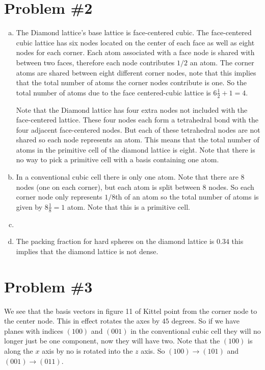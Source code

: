 \documentclass[11pt]{article}
\numberwithin{equation}{section}
\begin{document}
\section{Problem \#2}
\begin{enumerate}[(a)]
\item
The Diamond lattice's base lattice is face-centered cubic. The face-centered cubic lattice has six nodes located on the center of each face as well as eight nodes for each corner. Each atom associated with a face node is shared with between two faces, therefore each node contributes $1/2$ an atom. The corner atoms are shared between eight different corner nodes, note that this implies that the total number of atoms the corner nodes contribute is one. So the total number of atoms due to the face centered-cubic lattice is $6\frac{1}{2}+1=4$.

Note that the Diamond lattice has four extra nodes not included with the face-centered lattice. These four nodes each form a tetrahedral bond with the four adjacent face-centered nodes. But each of these tetrahedral nodes are not shared so each node represents an atom. This means that the total number of atoms in the primitive cell of the diamond lattice is eight. Note that there is no way to pick a primitive cell with a basis containing one atom.

\item
In a conventional cubic cell there is only one atom. Note that there are 8 nodes (one on each corner), but each atom is split between 8 nodes. So each corner node only represents $1/8$th of an atom so the total number of atoms is given by $8\frac{1}{8} = 1$ atom. Note that this is a primitive cell.

\item


\item
The packing fraction for hard spheres on the diamond lattice is $0.34$ this implies that the diamond lattice is not dense.

\end{enumerate}

\section{Problem \#3}
We see that the basis vectors in figure 11 of Kittel point from the corner node to the center node. This in effect rotates the axes by $45$ degrees. So if we have planes with indices $(100)$ and $(001)$ in the conventional cubic cell they will no longer just be one component, now they will have two. Note that the $(100)$ is along the $x$ axis by no is rotated into the $z$ axis.  So $(100)\rightarrow(101)$ and $(001)\rightarrow(011)$.
\end{document}
